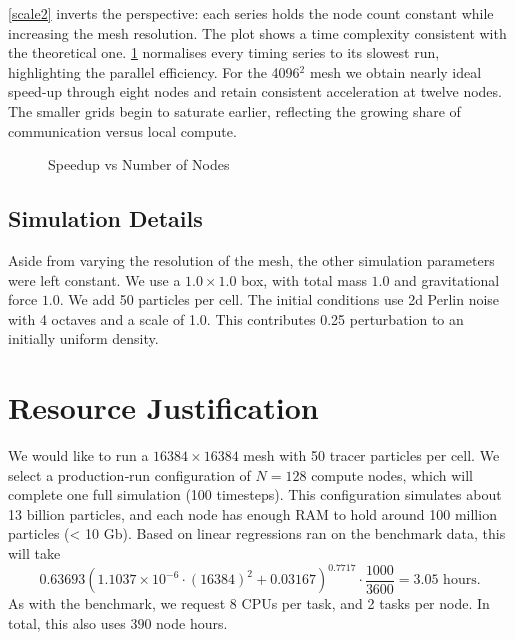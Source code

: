 \documentclass{lkx_paper}
\begin{document}
\cref{scale2} inverts the perspective: each series holds the node count constant while increasing the mesh resolution. The plot shows a time complexity consistent with the theoretical one.
\cref{scale3} normalises every timing series to its slowest run, highlighting the
parallel efficiency.
For the 4096\(^2\) mesh we obtain nearly ideal speed-up through eight nodes
and retain consistent acceleration at twelve nodes. The smaller grids begin to saturate earlier, reflecting the growing share of
communication versus local compute.

\begin{figure}[ht]
\caption{Speedup vs Number of Nodes}\label{scale3}
\end{figure}

\subsection{Simulation Details}

Aside from varying the resolution of the mesh, the other simulation parameters were left constant. We use a $1.0\times 1.0$ box, with total mass $1.0$ and gravitational force $1.0$. We add 50 particles per cell. The initial conditions use 2d Perlin noise with 4 octaves and a scale of 1.0. This contributes 0.25 perturbation to an initially uniform density.

\section{Resource Justification}
\label{sec:resources}

We would like to run a \(16384\times16384\) mesh with 50 tracer particles per cell. We select a production‐run configuration of \(N=128\) compute nodes, which will complete one full simulation (100 timesteps). This configuration simulates about 13 billion particles, and each node has enough RAM to hold around 100 million particles (< 10 Gb). Based on linear regressions ran on the benchmark data, this will take
\[
  0.63693(1.1037\times 10^{-6}\cdot (16384)^2 + 0.03167)^{0.7717} \cdot \frac{1000}{3600} = 3.05\textrm{ hours}.
\]
As with the benchmark, we request 8 CPUs per task, and 2 tasks per node. In total, this also uses $390$ node hours.
\end{document}
